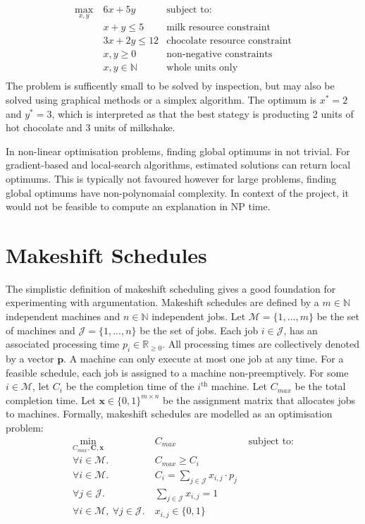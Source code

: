 \begin{align*}
	\max_{x,y}\ &6x+5y&\text{subject to:}\\
	&x+y\leq 5&\text{milk resource constraint}\\
	&3x+2y\leq 12&\text{chocolate resource constraint}\\
	&x,y\geq 0&\text{non-negative constraints}\\
	&x,y\in\mathbb{N}&\text{whole units only}\\
\end{align*}
The problem is sufficently small to be solved by inspection, but may also be solved using graphical methods or a simplex algorithm. The optimum is $x^*=2$ and $y^*=3$, which is interpreted as that the best stategy is producting 2 units of hot chocolate and 3 units of milkshake.

In non-linear optimisation problems, finding global optimums in not trivial. For gradient-based and local-search algorithms, estimated solutions can return local optimums. This is typically not favoured however for large problems, finding global optimums have non-polynomaial complexity. In context of the project, it would not be feasible to compute an explanation in NP time.

\section{Makeshift Schedules}

The simplistic definition of makeshift scheduling gives a good foundation for experimenting with argumentation. Makeshift schedules are defined by a $m\in\mathbb{N}$ independent machines and $n\in\mathbb{N}$ independent jobs. Let $\mathcal{M}=\{1,...,m\}$ be the set of machines and $\mathcal{J}=\{1,...,n\}$ be the set of jobs. Each job $i\in\mathcal{J}$, has an associated processing time $p_i\in\mathbb{R}_{\geq 0}$. All processing times are collectively denoted by a vector $\mathbf{p}$. A machine can only execute at most one job at any time. For a feasible schedule, each job is assigned to a machine non-preemptively. For some $i\in\mathcal{M}$, let $C_i$ be the completion time of the $i^\text{th}$ machine. Let $C_{max}$ be the total completion time. Let $\mathbf{x}\in\{0,1\}^{m\times n}$ be the assignment matrix that allocates jobs to machines. Formally, makeshift schedules are modelled as an optimisation problem:
\begin{align*}
	\min_{C_{max},\mathbf{C},\mathbf{x}}&C_{max}&\text{ subject to:}\\
	\forall i\in\mathcal{M}.\ &C_{max}\geq C_i\\
	\forall i\in\mathcal{M}.\ &C_i=\sum_{j\in\mathcal{J}}x_{i,j}\cdot p_j\\
	\forall j\in\mathcal{J}.\ &\sum_{j\in\mathcal{J}}x_{i,j}=1\\
	\forall i\in\mathcal{M},\ \forall j\in\mathcal{J}.\ &x_{i,j}\in\{0,1\}
\end{align*}

